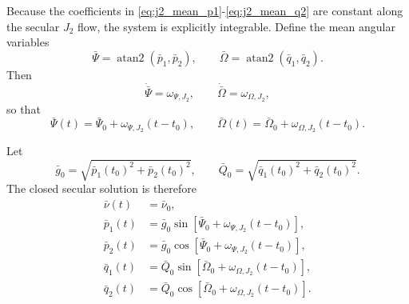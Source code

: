 \documentclass[11pt]{article}
\begin{document}
Because the coefficients in
\eqref{eq:j2_mean_p1}-\eqref{eq:j2_mean_q2} are constant along the secular
$J_2$ flow, the system is explicitly integrable. Define the mean angular
variables
\begin{equation}
\bar\Psi = \operatorname{atan2}(\bar p_1,\bar p_2),
\qquad
\bar\Omega = \operatorname{atan2}(\bar q_1,\bar q_2).
\end{equation}
Then
\begin{equation}
\dot{\bar\Psi} = \omega_{\Psi,J_2},
\qquad
\dot{\bar\Omega} = \omega_{\Omega,J_2},
\end{equation}
so that
\begin{equation}
\bar\Psi(t) = \bar\Psi_0 + \omega_{\Psi,J_2}(t-t_0),
\qquad
\bar\Omega(t) = \bar\Omega_0 + \omega_{\Omega,J_2}(t-t_0).
\end{equation}

Let
\begin{equation}
\bar g_0 = \sqrt{\bar p_1(t_0)^2 + \bar p_2(t_0)^2},
\qquad
\bar Q_0 = \sqrt{\bar q_1(t_0)^2 + \bar q_2(t_0)^2}.
\end{equation}
The closed secular solution is therefore
\begin{align}
\bar\nu(t) &= \bar\nu_0, \\
\bar p_1(t) &= \bar g_0
\sin\!\left[\bar\Psi_0 + \omega_{\Psi,J_2}(t-t_0)\right], \\
\bar p_2(t) &= \bar g_0
\cos\!\left[\bar\Psi_0 + \omega_{\Psi,J_2}(t-t_0)\right], \\
\bar q_1(t) &= \bar Q_0
\sin\!\left[\bar\Omega_0 + \omega_{\Omega,J_2}(t-t_0)\right], \\
\bar q_2(t) &= \bar Q_0
\cos\!\left[\bar\Omega_0 + \omega_{\Omega,J_2}(t-t_0)\right].
\label{eq:j2_closed_form}
\end{align}
\end{document}

